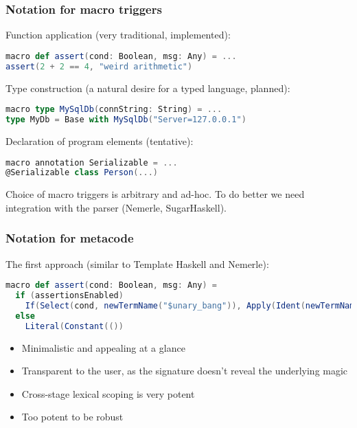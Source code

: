 \documentclass[hyperref={bookmarks=false}]{beamer}
\begin{document}
\begin{frame}[fragile]
\frametitle{Notation for macro triggers}

Function application (very traditional, implemented):
\begin{lstlisting}[language=scala]
macro def assert(cond: Boolean, msg: Any) = ...
assert(2 + 2 == 4, "weird arithmetic")
\end{lstlisting}

Type construction (a natural desire for a typed language, planned):
\begin{lstlisting}[language=scala]
macro type MySqlDb(connString: String) = ...
type MyDb = Base with MySqlDb("Server=127.0.0.1")
\end{lstlisting}

Declaration of program elements (tentative):
\begin{lstlisting}[language=scala]
macro annotation Serializable = ...
@Serializable class Person(...)
\end{lstlisting}

Choice of macro triggers is arbitrary and ad-hoc. To do better we need integration with the parser (Nemerle, SugarHaskell).
\end{frame}

\begin{frame}[fragile]
\frametitle{Notation for metacode}
The first approach (similar to Template Haskell and Nemerle):
\begin{lstlisting}[language=scala]
macro def assert(cond: Boolean, msg: Any) =
  if (assertionsEnabled)
    If(Select(cond, newTermName("$unary_bang")), Apply(Ident(newTermName("raise")), List(msg)), Literal(Constant(())))
  else
    Literal(Constant(())
\end{lstlisting}

\begin{itemize}
\item Minimalistic and appealing at a glance
\item Transparent to the user, as the signature doesn't reveal the underlying magic
\item Cross-stage lexical scoping is very potent
\item Too potent to be robust
\end{itemize}
\end{frame}
\end{document}
